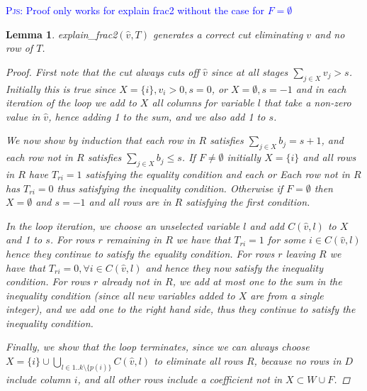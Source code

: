 \documentclass{article}
\newtheorem{lemma}{Lemma}
\newcommand{\pjs}[1]{\textcolor{blue}{\textsc{Pjs:} #1}}
\begin{document}
\pjs{Proof only works for explain frac2 without the case for $F = \emptyset$}
\begin{lemma}
   \textsf{explain\_frac2}$(\hat{v}, T)$ generates a correct cut eliminating $v$ and no row of $T$.
    \begin{proof}
     First note that the cut always cuts off $\hat{v}$ since at all stages 
     $\sum_{j \in X} v_j > s$.
     Initially this is true since $X = \{i\}, v_i > 0, s = 0$, 
     or $X = \emptyset, s = -1$ 
     and in each iteration of the loop
     we add to $X$ all columns for variable $l$ that take a non-zero value in $\hat{v}$, hence adding 1 to the sum, and we also add 1 to $s$. 

     We now show by induction that each 
     row in $R$ satisfies $\sum_{j \in X} b_j  = s+1$, and each row not in $R$ satisfies
     $\sum_{j \in X} b_j \leq s$. 
     If $F \neq \emptyset$ initially $X = \{i\}$ and all rows in $R$ have $T_{ri} = 1$ satisfying the equality condition and each or
     Each row not in $R$ has $T_{ri} = 0$ thus satisfying the inequality condition. 
     Otherwise if $F = \emptyset$ then
     $X = \emptyset$ and $s = -1$ and all rows are in $R$ satisfying the first condition.
 
     In the loop iteration, we choose an unselected variable $l$ and add $C(\hat{v},l)$ to $X$ and 1 to $s$. 
     For rows $r$ remaining in $R$ we have that $T_{ri} = 1$ for some $i \in C(\hat{v},l)$ hence they continue to satisfy the equality condition. For rows $r$ leaving $R$ we have that $T_{ri} = 0, \forall i \in C(\hat{v},l)$ and hence they now satisfy the inequality condition. 
     For rows $r$ already not in $R$, we add at most one to the sum in the inequality condition (since all new variables added to $X$ are from a single integer), and we add one to the right hand side, thus they continue to satisfy the inequality condition.

     Finally, we show that the loop terminates, since we can always choose $X = \{i\} \cup \bigcup_{l \in 1..k \setminus \{p(i)\}} C(\hat{v},l)$ to eliminate all rows $R$, because no rows in $D$ include column $i$, and all other rows include a coefficient not in $X \subset W \cup F$. 
    \end{proof}
\end{lemma}
\end{document}
